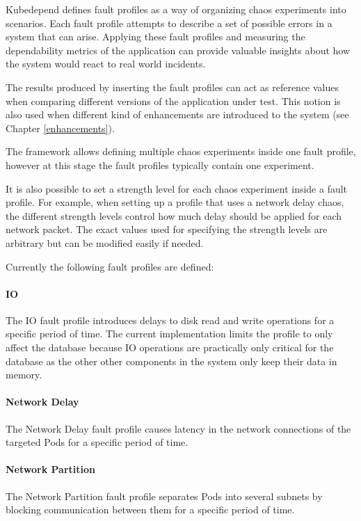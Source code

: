 Kubedepend defines fault profiles as a way of organizing chaos experiments into scenarios. Each fault profile attempts to describe a set of possible errors in a system that can arise. Applying these fault profiles and measuring the dependability metrics of the application can provide valuable insights about how the system would react to real world incidents.

The results produced by inserting the fault profiles can act as reference values when comparing different versions of the application under test. This notion is also used when different kind of enhancements are introduced to the system (see Chapter \ref{enhancements}).

The framework allows defining multiple chaos experiments inside one fault profile, however at this stage the fault profiles typically contain one experiment. 

It is also possible to set a strength level for each chaos experiment inside a fault profile. For example, when setting up a profile that uses a network delay chaos, the different strength levels control how much delay should be applied for each network packet. The exact values used for specifying the strength levels are arbitrary but can be modified easily if needed.

Currently the following fault profiles are defined:

\paragraph{IO} The IO fault profile introduces delays to disk read and write operations for a specific period of time. The current implementation limits the profile to only affect the database because IO operations are practically only critical for the database as the other other components in the system only keep their data in memory.

\paragraph{Network Delay} The Network Delay fault profile causes latency in the network connections of the targeted Pods for a specific period of time.

\paragraph{Network Partition} The Network Partition fault profile separates Pods into several subnets by blocking communication between them for a specific period of time.

